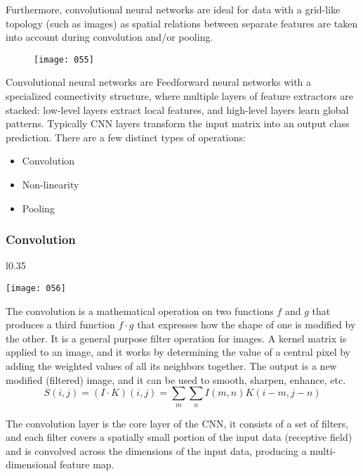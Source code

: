 Furthermore, convolutional neural networks are ideal for data with a grid-like topology (such as images) as spatial relations between separate features are taken into account during convolution and/or pooling.

\begin{figure}[h!]
    \centering
    \texttt{[image: 055]}
    \caption{}
    \label{fig:055}
\end{figure}

Convolutional neural networks are Feedforward neural networks with a specialized connectivity structure, where multiple layers of feature extractors are stacked: low-level layers extract local features, and high-level layers learn global patterns. Typically CNN layers transform the input matrix into an output class prediction. There are a few distinct types of operations:
\begin{itemize}[topsep={0pt}, partopsep={0pt}]
    \itemsep0pt
    \item Convolution
    \item Non-linearity
    \item Pooling
\end{itemize}

\subsubsection{Convolution}
\begin{wrapfigure}{l}{0.35\textwidth}
    \begin{center}
        \texttt{[image: 056]}
        \caption{}
    \end{center}
    \label{fig:056}
\end{wrapfigure}

The convolution is a mathematical operation on two functions \(f\) and \(g\) that produces a third function \(f \cdot g\) that expresses how the shape of one is modified by the other. It is a general purpose filter operation for images. A kernel matrix is applied to an image, and it works by determining the value of a central pixel by adding the weighted values of all its neighbors together. The output is a new modified (filtered) image, and it can be used to smooth, sharpen, enhance, etc.
\begin{equation}
    S(i,j) = (I \cdot K)(i,j) = \sum_m \sum_n I(m,n)K(i-m,j-n)
\end{equation}

The convolution layer is the core layer of the CNN, it consists of a set of filters, and each filter covers a spatially small portion of the input data (receptive field) and is convolved across the dimensions of the input data, producing a multi-dimensional feature map.

